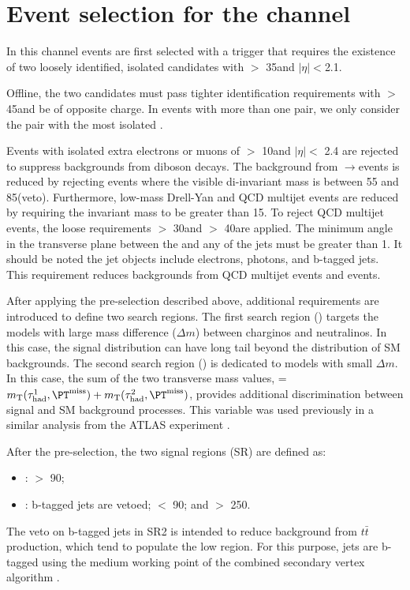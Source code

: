 \section{\texorpdfstring{Event selection for the \tauTau channel}{Event selection for the tau-tau channel}}
\label{sect:tauTauCuts}
In this channel events are first selected with a trigger \cite{Khachatryan:2015hwa,Chatrchyan:2012xi,Chatrchyan:2011nv}
that requires the existence of
two loosely identified, isolated \Tau candidates with \PT $>$ 35\GeV and $|\eta|<$2.1.   

Offline, the two \Tau candidates must pass tighter identification requirements with \PT $>$ 45\GeV and be of opposite charge.
In events with more than one \tauTau pair, we only consider the pair with the most isolated \Tau. 

Events with isolated extra electrons or muons of \PT $>$ 10\GeV and $|\eta| <$ 2.4 
are rejected to suppress %
backgrounds from diboson decays.
The background from \Z$\rightarrow$\tauTau events is reduced by rejecting events where the visible
di-\Tau invariant mass is between 55 and 85\GeV (\Z veto).  Furthermore, 
low-mass Drell-Yan and QCD multijet events are reduced by requiring the invariant mass to be greater than 15\GeV.
To reject QCD multijet events, the loose requirements \MPT $>$ 30\GeV and \mttwo $>$ 40\GeV are applied.
The minimum angle \deltaphi in the transverse plane between the \ptvecmiss and any of the jets must be greater than 1. 
It should be noted the jet objects include electrons, photons, \Tau and b-tagged jets.
This requirement reduces backgrounds from QCD multijet events and \wjets events.

After applying the pre-selection described above,
additional requirements are introduced to define two search regions.
The first search region (\binone) targets the models with large mass difference ($\Delta m$) 
between charginos and neutralinos.
In this case, the \mttwo signal distribution can have long tail beyond the 
distribution of SM backgrounds.
The second search region (\bintwo) is dedicated to models with small $\Delta m$.  
In this case, the sum of the two transverse mass values, \SumMT = $\mt(\Tau^1,\MPT) + \mt(\Tau^2,\MPT)$, 
provides additional discrimination between signal and SM background processes.
This variable was used previously in a similar analysis from the ATLAS experiment \cite{Aad:2014yka}.

After the pre-selection, the two signal regions (SR) are defined as:
\begin{itemize}
\item {\bf \binone}: \mttwo $>$ 90\GeV;
\item {\bf \bintwo}: b-tagged jets are vetoed; \mttwo $<$ 90\GeV; and \SumMT $>$ 250\GeV.
\end{itemize}
The veto on b-tagged jets in SR2 is intended to reduce
background from $t\bar{t}$ production, which
tend to populate the low \mttwo region.  For this purpose, jets are b-tagged
using the medium working point of the combined secondary vertex algorithm \cite{Chatrchyan:2012jua}. 

